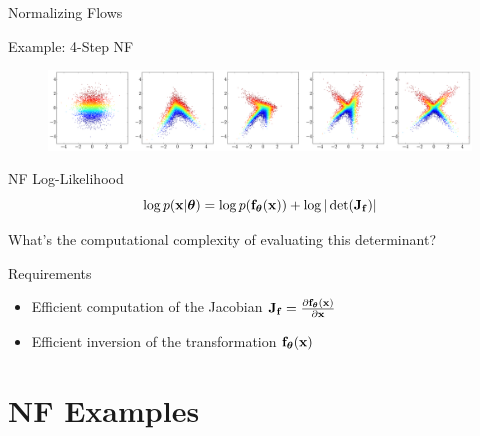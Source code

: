 \documentclass{beamer}
\begin{document}
\begin{frame}{Normalizing Flows}
	\begin{block}{Example: 4-Step NF}
		\vspace{-0.2cm}
		\begin{figure}
			\includegraphics[width=\linewidth]{figs/flow_4_steps_example.png}
		\end{figure}
	\end{block}
    \eqpause
	\vspace{-0.5cm}
	\begin{block}{NF Log-Likelihood}
		\vspace{-0.3cm}
		\[
			\log p(\mathbf{x}|\boldsymbol{\theta}) = \log p(\mathbf{f}_{\boldsymbol{\theta}}(\mathbf{x})) + \log |\det ( \mathbf{J}_{\mathbf{f}})|
		\]
		\vspace{-0.5cm}
	\end{block}
	What's the computational complexity of evaluating this determinant?
    \eqpause
	\begin{block}{Requirements}
		\begin{itemize}
			\item Efficient computation of the Jacobian $\mathbf{J}_{\mathbf{f}} = \frac{\partial \mathbf{f}_{\boldsymbol{\theta}}(\mathbf{x})}{\partial \mathbf{x}}$
			\item Efficient inversion of the transformation $\mathbf{f}_{\boldsymbol{\theta}}(\mathbf{x})$
		\end{itemize}
	\end{block}
\end{frame}
\section{NF Examples}
\end{document}
